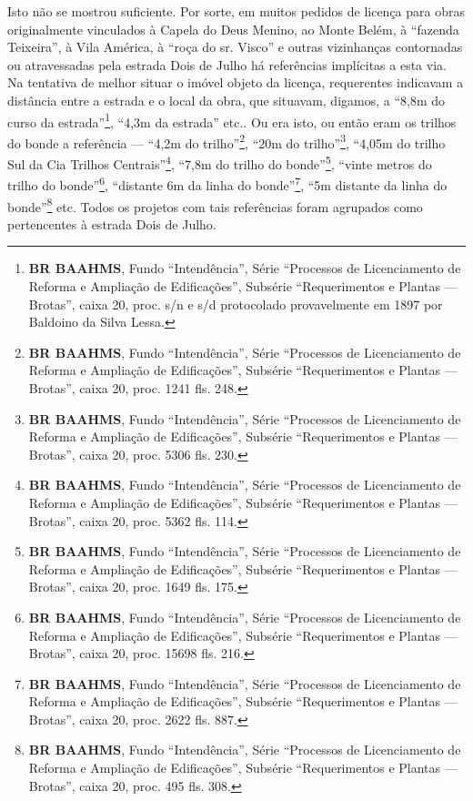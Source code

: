 Isto não se mostrou suficiente. Por sorte, em muitos pedidos de licença para obras originalmente vinculados à Capela do Deus Menino, ao Monte Belém, à ``fazenda Teixeira'', à Vila América, à ``roça do sr. Visco'' e outras vizinhanças contornadas ou atravessadas pela estrada Dois de Julho há referências implícitas a esta via. Na tentativa de melhor situar o imóvel objeto da licença, requerentes indicavam a distância entre a estrada e o local da obra, que situavam, digamos, a ``8,8m do curso da estrada''\footnote{\textbf{BR BAAHMS}, Fundo ``Intendência'', Série ``Processos de Licenciamento de Reforma e Ampliação de Edificações'', Subsérie ``Requerimentos e Plantas --- Brotas'', caixa 20, proc. s/n e s/d protocolado provavelmente em 1897 por Baldoino da Silva Lessa.}, ``4,3m da estrada'' etc.. Ou era isto, ou então eram os trilhos do bonde a referência --- ``4,2m do trilho''\footnote{\textbf{BR BAAHMS}, Fundo ``Intendência'', Série ``Processos de Licenciamento de Reforma e Ampliação de Edificações'', Subsérie ``Requerimentos e Plantas --- Brotas'', caixa 20, proc. 1241 fls. 248.}, ``20m do trilho''\footnote{\textbf{BR BAAHMS}, Fundo ``Intendência'', Série ``Processos de Licenciamento de Reforma e Ampliação de Edificações'', Subsérie ``Requerimentos e Plantas --- Brotas'', caixa 20, proc. 5306 fls. 230.}, ``4,05m do trilho Sul da Cia Trilhos Centrais''\footnote{\textbf{BR BAAHMS}, Fundo ``Intendência'', Série ``Processos de Licenciamento de Reforma e Ampliação de Edificações'', Subsérie ``Requerimentos e Plantas --- Brotas'', caixa 20, proc. 5362 fls. 114.}, ``7,8m do trilho do bonde''\footnote{\textbf{BR BAAHMS}, Fundo ``Intendência'', Série ``Processos de Licenciamento de Reforma e Ampliação de Edificações'', Subsérie ``Requerimentos e Plantas --- Brotas'', caixa 20, proc. 1649 fls. 175.}, ``vinte metros do trilho do bonde''\footnote{\textbf{BR BAAHMS}, Fundo ``Intendência'', Série ``Processos de Licenciamento de Reforma e Ampliação de Edificações'', Subsérie ``Requerimentos e Plantas --- Brotas'', caixa 20, proc. 15698 fls. 216.}, ``distante 6m da linha do bonde''\footnote{\textbf{BR BAAHMS}, Fundo ``Intendência'', Série ``Processos de Licenciamento de Reforma e Ampliação de Edificações'', Subsérie ``Requerimentos e Plantas --- Brotas'', caixa 20, proc. 2622 fls. 887.}, ``5m distante da linha do bonde''\footnote{\textbf{BR BAAHMS}, Fundo ``Intendência'', Série ``Processos de Licenciamento de Reforma e Ampliação de Edificações'', Subsérie ``Requerimentos e Plantas --- Brotas'', caixa 20, proc. 495 fls. 308.} etc. Todos os projetos com tais referências foram agrupados como pertencentes à estrada Dois de Julho. 

